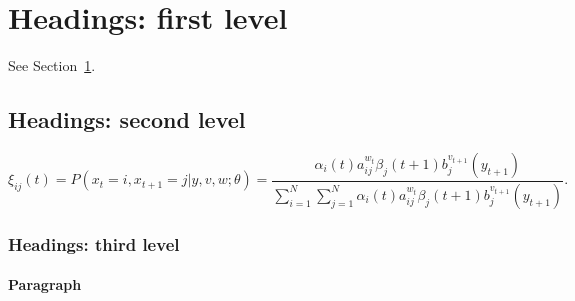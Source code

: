 \section{Headings: first level}
\label{sec:headings}

\lipsum[4] See Section~\ref{sec:headings}.

\subsection{Headings: second level}
\label{subsec:headings_level2}

\lipsum[5]
\begin{equation}
	\xi _{ij}(t)=P(x_{t}=i,x_{t+1}=j|y,v,w;\theta)= {\frac {\alpha _{i}(t)a^{w_t}_{ij}\beta _{j}(t+1)b^{v_{t+1}}_{j}(y_{t+1})}{\sum _{i=1}^{N} \sum _{j=1}^{N} \alpha _{i}(t)a^{w_t}_{ij}\beta _{j}(t+1)b^{v_{t+1}}_{j}(y_{t+1})}}.
	\label{eq:transisi_probabilitas}
\end{equation}

\subsubsection{Headings: third level}
\label{subsubsec:headings_level3}

\lipsum[6]

\paragraph{Paragraph}
\lipsum[7]
